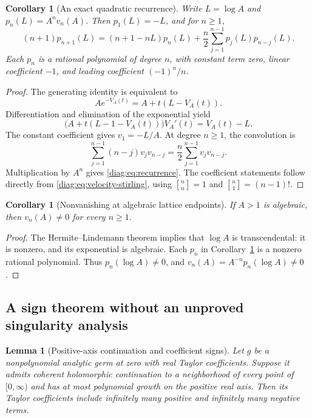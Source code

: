 \documentclass[11pt,a4paper]{article}
\newtheorem{lemma}[theorem]{Lemma}
\newtheorem{corollary}[theorem]{Corollary}
\theoremstyle{definition}
\theoremstyle{remark}
\newcommand{\stirling}[2]{\genfrac{[}{]}{0pt}{}{#1}{#2}}
\numberwithin{equation}{section}
\begin{document}
\begin{corollary}[An exact quadratic recurrence]\label{diag:cor:recurrence}
Write $L=\log A$ and $p_n(L)=A^n v_n(A)$.  Then $p_1(L)=-L$, and for
$n\geq1$,
\begin{equation}\label{diag:eq:recurrence}
 (n+1)p_{n+1}(L)
   =(n+1-nL)p_n(L)
       +\frac n2\sum_{j=1}^{n-1}p_j(L)p_{n-j}(L).
\end{equation}
Each $p_n$ is a rational polynomial of degree $n$, with constant term zero,
linear coefficient $-1$, and leading coefficient $(-1)^n/n$.
\end{corollary}

\begin{proof}
The generating identity is equivalent to
\[
 A e^{-V_A(t)}=A+t(L-V_A(t)).
\]
Differentiation and elimination of the exponential yield
\begin{equation}\label{diag:eq:ode}
 \bigl(A+t(L-1-V_A(t))\bigr)V_A'(t)=V_A(t)-L.
\end{equation}
The constant coefficient gives $v_1=-L/A$.  At degree $n\geq1$, the
convolution is
\[
 \sum_{j=1}^{n-1}(n-j)v_jv_{n-j}
       =\frac n2\sum_{j=1}^{n-1}v_jv_{n-j}.
\]
Multiplication by $A^n$ gives \eqref{diag:eq:recurrence}.  The coefficient
statements follow directly from \eqref{diag:eq:velocity-stirling}, using
$\stirling{n}{n}=1$ and
$\stirling{n}{1}=(n-1)!$.
\end{proof}

\begin{corollary}[Nonvanishing at algebraic lattice endpoints]
\label{diag:cor:algebraic-nonvanishing}
If $A>1$ is algebraic, then $v_n(A)\ne0$ for every $n\ge1$.
\end{corollary}
\begin{proof}
The Hermite--Lindemann theorem implies that $\log A$ is transcendental:
it is nonzero, and its exponential is algebraic. Each $p_n$ in
Corollary~\ref{diag:cor:recurrence} is a nonzero rational polynomial.
Thus $p_n(\log A)\ne0$, and $v_n(A)=A^{-n}p_n(\log A)\ne0$.
\end{proof}

\subsection{A sign theorem without an unproved singularity analysis}
\label{diag:subsec:signs}

\begin{lemma}[Positive-axis continuation and coefficient signs]
\label{diag:lem:pringsheim}
Let $g$ be a nonpolynomial analytic germ at zero with real Taylor
coefficients.  Suppose it admits coherent holomorphic continuation to a
neighborhood of every point of $[0,\infty)$ and has at most polynomial
growth on the positive real axis.  Then its Taylor coefficients include
infinitely many positive and infinitely many negative terms.
\end{lemma}
\end{document}
